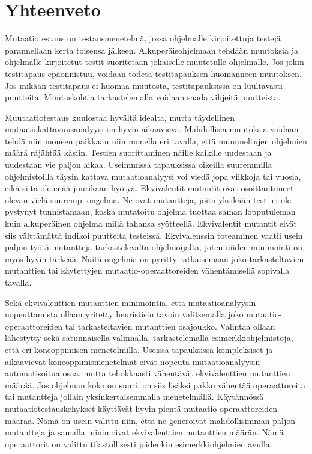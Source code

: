 \documentclass[finnish]{tktltiki2}
\begin{document}
\section{Yhteenveto}
Mutaatiotestaus on testausmenetelmä, jossa ohjelmalle kirjoitettuja testejä parannellaan kerta toisensa jälkeen. Alkuperäisohjelmaan tehdään muutoksia ja ohjelmalle kirjoitetut testit suoritetaan jokaiselle muutetulle ohjelmalle. Jos jokin testitapaus epäonnistuu, voidaan todeta testitapauksen huomanneen muutoksen. Jos mikään testitapaus ei huomaa muutosta, testitapauksissa on luultavasti puutteita. Muutoskohtia tarkastelemalla voidaan saada vihjeitä puutteista. 

Muutaatiotestaus kuulostaa hyvältä idealta, mutta täydellinen mutaatiokattavuusanalyysi on hyvin aikaavievä. Mahdollisia muutoksia voidaan tehdä niin moneen paikkaan niin monella eri tavalla, että muunneltujen ohjelmien määrä räjähtää käsiin. Testien suorittaminen näille kaikille uudestaan ja uudestaan vie paljon aikaa. Useimmissa tapauksissa oikeilla suuremmilla ohjelmistoilla täysin kattava mutaatioanalyysi voi viedä jopa viikkoja tai vuosia, eikä siitä ole enää juurikaan hyötyä. Ekvivalentit mutantit ovat osoittautuneet olevan vielä suurempi ongelma. Ne ovat mutantteja, joita yksikään testi ei ole pystynyt tunnistamaan, koska mutatoitu ohjelma tuottaa saman lopputuleman kuin alkuperäinen ohjelma millä tahansa syötteellä. Ekvivalentit mutantit eivät siis välttämättä indikoi puutteita testeissä. Ekvivalenssin toteaminen vaatii usein paljon työtä mutantteja tarkastelevalta ohjelmoijalta, joten niiden minimointi on myös hyvin tärkeää. Näitä ongelmia on pyritty ratkaisemaan joko tarkasteltavien mutanttien tai käytettyjen mutaatio-operaattoreiden vähentämisellä sopivalla tavalla. 

Sekä ekvivalenttien mutanttien minimointia, että mutaatioanalyysin nopeuttamista ollaan yritetty heuristisin tavoin valitsemalla joko mutaatio-operaattoreiden tai tarkasteltavien mutanttien osajoukko. Valintaa ollaan lähestytty sekä satunnaisella valinnalla, tarkastelemalla esimerkkiohjelmistoja, että eri koneoppimisen menetelmillä. Useissa tapauksissa kompleksiset ja aikaavievät koneoppimismenetelmät eivät nopeuta mutaatioanalyysin automatisoitua osaa, mutta tehokkaasti vähentävät ekvivalenttien mutanttien määrää. Jos ohjelman koko on suuri, on siis lisäksi pakko vähentää operaattoreita tai mutantteja jollain yksinkertaisemmalla menetelmällä. Käytännössä mutaatiotestauskehykset käyttävät hyvin pientä mutaatio-operaattoreiden määrää. Nämä on usein valittu niin, että ne generoivat mahdollisimman paljon mutantteja ja samalla minimoivat ekvivalenttien mutanttien määrän. Nämä operaattorit on valittu tilastollisesti joidenkin esimerkkiohjelmien avulla.

{}

\end{document}
